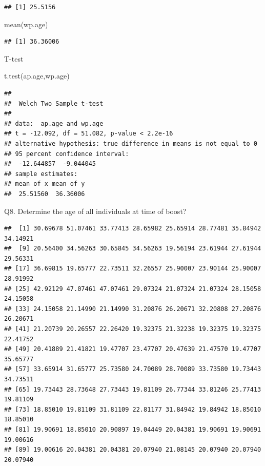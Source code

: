 \documentclass[
]{article}
\newenvironment{Shaded}{\begin{snugshade}}{\end{snugshade}}
\newcommand{\FunctionTok}[1]{\textcolor[rgb]{0.00,0.00,0.00}{#1}}
\newcommand{\NormalTok}[1]{#1}
\newcommand{\OtherTok}[1]{\textcolor[rgb]{0.56,0.35,0.01}{#1}}
\newcommand{\SpecialCharTok}[1]{\textcolor[rgb]{0.00,0.00,0.00}{#1}}
\newcommand{\StringTok}[1]{\textcolor[rgb]{0.31,0.60,0.02}{#1}}
\begin{document}
\begin{verbatim}
## [1] 25.5156
\end{verbatim}

\begin{Shaded}
\begin{Highlighting}[]
\FunctionTok{mean}\NormalTok{(wp.age)}
\end{Highlighting}
\end{Shaded}

\begin{verbatim}
## [1] 36.36006
\end{verbatim}

T-test

\begin{Shaded}
\begin{Highlighting}[]
\FunctionTok{t.test}\NormalTok{(ap.age,wp.age)}
\end{Highlighting}
\end{Shaded}

\begin{verbatim}
## 
##  Welch Two Sample t-test
## 
## data:  ap.age and wp.age
## t = -12.092, df = 51.082, p-value < 2.2e-16
## alternative hypothesis: true difference in means is not equal to 0
## 95 percent confidence interval:
##  -12.644857  -9.044045
## sample estimates:
## mean of x mean of y 
##  25.51560  36.36006
\end{verbatim}

Q8. Determine the age of all individuals at time of boost?

\begin{Shaded}
\end{Shaded}

\begin{verbatim}
##  [1] 30.69678 51.07461 33.77413 28.65982 25.65914 28.77481 35.84942 34.14921
##  [9] 20.56400 34.56263 30.65845 34.56263 19.56194 23.61944 27.61944 29.56331
## [17] 36.69815 19.65777 22.73511 32.26557 25.90007 23.90144 25.90007 28.91992
## [25] 42.92129 47.07461 47.07461 29.07324 21.07324 21.07324 28.15058 24.15058
## [33] 24.15058 21.14990 21.14990 31.20876 26.20671 32.20808 27.20876 26.20671
## [41] 21.20739 20.26557 22.26420 19.32375 21.32238 19.32375 19.32375 22.41752
## [49] 20.41889 21.41821 19.47707 23.47707 20.47639 21.47570 19.47707 35.65777
## [57] 33.65914 31.65777 25.73580 24.70089 28.70089 33.73580 19.73443 34.73511
## [65] 19.73443 28.73648 27.73443 19.81109 26.77344 33.81246 25.77413 19.81109
## [73] 18.85010 19.81109 31.81109 22.81177 31.84942 19.84942 18.85010 18.85010
## [81] 19.90691 18.85010 20.90897 19.04449 20.04381 19.90691 19.90691 19.00616
## [89] 19.00616 20.04381 20.04381 20.07940 21.08145 20.07940 20.07940 20.07940
\end{verbatim}
\end{document}
